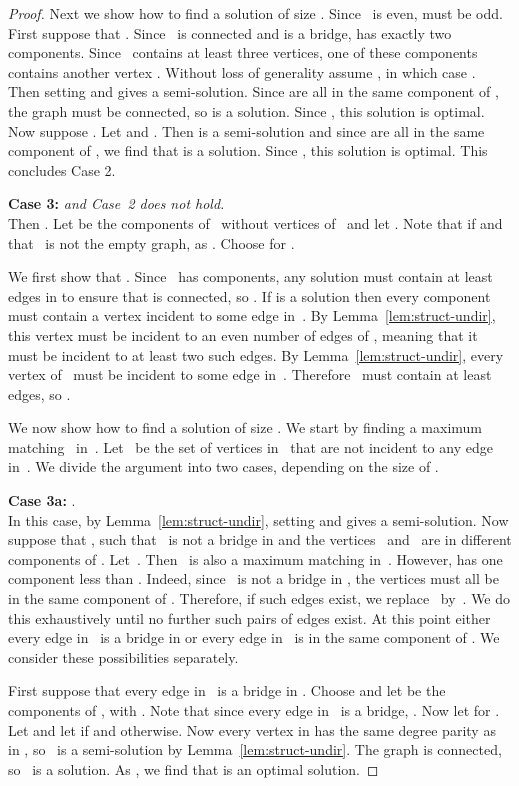 \documentclass[11pt]{llncs}
\newcommand\displaycase[1]{{\bf #1}}
\begin{document}
\begin{proof}
Next we show how to find a solution of size .  Since~ is
even,  must be odd. First suppose that . Since~ is connected and
 is a bridge,  has exactly two components.
Since~ contains at least three vertices, one of these components contains
another vertex . Without loss of generality assume , in which
case  .
Then setting  and  gives a
semi-solution.  Since  are all in the same component of , the
graph  must be connected, so  is a solution. Since
, this solution is optimal.  
Now suppose .
Let  and . Then  is a semi-solution and since
 are all in the same component of , we find that   is a
solution. Since , this solution is
optimal.
This concludes Case 2.

\medskip
\noindent
\displaycase{Case 3:} {\em  and Case~2 does not hold.}\\
Then .
Let  be the components of~ without vertices of~  and let
. Note that  if  and that~ is not
the empty graph, as .  Choose  for .

We first show that .
Since~ has  components, any solution  must contain at least
 edges in  to ensure that  is connected, so
. If  is a solution then every
component~ must contain a vertex incident to some edge in~.  By
Lemma~\ref{lem:struct-undir}, this vertex must be incident to an even number of
edges of , meaning that it must be incident to at least two such
edges. By Lemma~\ref{lem:struct-undir}, every vertex of~ must be incident to
some edge in~. Therefore~ must contain at least
 edges, so .

We now show how to find a solution of size . We
start by finding a maximum matching~ in~. Let~ be the
set of vertices in~ that are not incident to any edge in~. We divide the
argument into two cases, depending on the size of .

\medskip
\noindent
\displaycase{Case 3a:} .\\
In this case, by Lemma~\ref{lem:struct-undir}, setting  and 
gives a semi-solution. Now suppose that , such that~ is not a
bridge in  and the vertices~ and~ are in different components of
.  Let~. Then~ is also a
maximum matching in~. However,  has one component less
than .  Indeed, since~ is not a bridge in , the vertices
 must all be in the same component of . Therefore, if such
edges  exist, we replace~ by~. We do this exhaustively
until no further such pairs of edges exist. At this point either every edge
in~ is a bridge
in 
or every edge in~ is in the same component of .  We
consider these possibilities separately.

First suppose that every edge in~ is a bridge
in . 
Choose  and let
 be the components of , with .  Note that
since every edge in~ is a bridge, . Now let  for
. Let  and let  if  and  otherwise.  Now
every vertex in  has the same degree parity as in , so~ is a
semi-solution by Lemma~\ref{lem:struct-undir}. The graph  is connected,
so~ is a solution. As  , we find that  is an optimal solution.


\end{proof}
\end{document}
